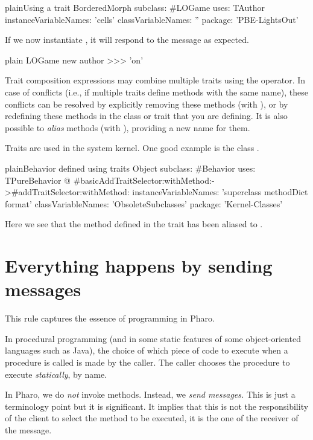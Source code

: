\documentclass[10pt,twoside,english]{_support/latex/sbabook/sbabook}
\begin{document}
\begin{listing}[float, label=scr:sbegamewithtrait]{plain}{Using a trait}
BorderedMorph subclass: #LOGame
    uses: TAuthor
    instanceVariableNames: 'cells'
    classVariableNames: ''
    package: 'PBE-LightsOut'
\end{listing}

If we now instantiate , it will respond to the  message as
expected.

\begin{displaycode}{plain}
LOGame new author
>>> 'on'
\end{displaycode}

Trait composition expressions may combine multiple traits using the \textcode{+}
operator. In case of conflicts (i.e., if multiple traits define methods with
the same name), these conflicts can be resolved by explicitly removing these
methods (with \textcode{-}), or by redefining these methods in the class or trait that
you are defining. It is also possible to \textit{alias} methods (with ),
providing a new name for them.

Traits are used in the system kernel. One good example is the class
.

\begin{listing}[float, label=scr:behaviorwithtraits]{plain}{Behavior defined using traits}
Object subclass: #Behavior
    uses: TPureBehavior @ {#basicAddTraitSelector:withMethod:->#addTraitSelector:withMethod:}
    instanceVariableNames: 'superclass methodDict format'
    classVariableNames: 'ObsoleteSubclasses'
    package: 'Kernel-Classes'
\end{listing}

Here we see that the method  defined in the
trait  has been aliased to
.
\chapter{Everything happens by sending messages}
This rule captures the essence of programming in Pharo.

In procedural programming (and in some static features of some object-oriented
languages such as Java), the choice of which piece of code to execute when a
procedure is called is made by the caller. The caller chooses the procedure to
execute \textit{statically}, by name.

In Pharo, we do \textit{not} invoke methods. Instead, we \textit{send messages.} This is
just a terminology point but it is significant. It implies that this is not the
responsibility of the client to select the method to be executed, it is the one
of the receiver of the message.
\end{document}
